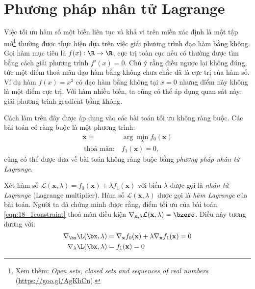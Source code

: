 
\chapter{Phương pháp nhân tử Lagrange}
\label{apd:lagrange}

Việc tối ưu hàm số một biến liên tục và khả vi trên miền xác định
là một tập mở\footnote{Xem thêm:
\textit{Open sets, closed
sets and sequences of real numbers} (\url{https://goo.gl/AgKhCn}).} thường được thực hiện dựa trên
việc giải
phương trình đạo hàm bằng không. Gọi hàm mục tiêu là $f(x): \R \rightarrow \R$,
cực trị toàn cục nếu có thường được tìm bằng cách giải
phương trình $f'(x) = 0$. Chú ý rằng điều ngược lại không đúng, tức một điểm
thoả mãn đạo hàm bằng không chưa chắc đã là cực trị của hàm số. Ví dụ hàm $f(x) = x^3$ có đạo hàm bằng không tại $x =0$ nhưng điểm này không là một điểm cực trị. Với hàm nhiều biến, ta cũng có thể áp dụng quan sát này: giải phương trình gradient bằng không.

Cách làm trên đây được áp dụng vào các bài toán tối ưu không ràng buộc. Các bài toán có ràng buộc là một phương
trình:
\begin{eqnarray}
\nonumber
\mathbf{x}=& \arg\min_{\mathbf{x}} f_0(\mathbf{x}) \\\
\label{eqn:18_1constraint}
\text{thoả mãn:}~& f_1(\mathbf{x}) = 0,
\end{eqnarray}
cũng có thể được đưa về bài toán không ràng buộc bằng \textit{phương pháp nhân tử Lagrange}.


Xét hàm số $\mathcal{L}(\mathbf{x}, \lambda) = f_0(\mathbf{x}) + \lambda
f_1(\mathbf{x})$ với biến $\lambda$ được gọi là \textit{nhân tử Lagrange}
({Lagrange multiplier}). Hàm số $\mathcal{L}(\mathbf{x}, \lambda)$ được
gọi là \textit{hàm Lagrange} của bài toán. Người ta đã chứng minh được rằng, điểm tối ưu của
bài toán \eqref{eqn:18_1constraint} thoả mãn điều kiện $\nabla_{\mathbf{x},
\lambda} \mathcal{L}(\mathbf{x}, \lambda) = \bzero$. Điều này tương đương với:
\begin{align}
\label{eqn:18_2}
\nabla_{\bx} \L(\bx, \lambda) &=  \nabla_{\mathbf{x}}f_0(\mathbf{x}) + \lambda
\nabla_{\mathbf{x}} f_1(\mathbf{x}) = 0 \\\
\label{eqn:18_3}
\nabla_{\lambda}\L(\bx, \lambda) &= f_1(\mathbf{x}) = 0
\end{align}

